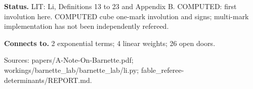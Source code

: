 \documentclass[10pt,a4paper]{amsart}
\begin{document}
\textbf{Status.} LIT: Li, Definitions 13 to 23 and Appendix B. COMPUTED: first involution here. COMPUTED cube one-mark involution and signs; multi-mark implementation has not been independently refereed.

\textbf{Connects to.} 2 exponential terms; 4 linear weights; 26 open doors.

{\footnotesize\raggedright Sources: papers/\allowbreak{}A-Note-On-Barnette.pdf;\allowbreak{} workings/\allowbreak{}barnette\_lab/\allowbreak{}barnette\_lab/\allowbreak{}li.py;\allowbreak{} fable\_referee-determinants/\allowbreak{}REPORT.md.\par}
\end{document}
